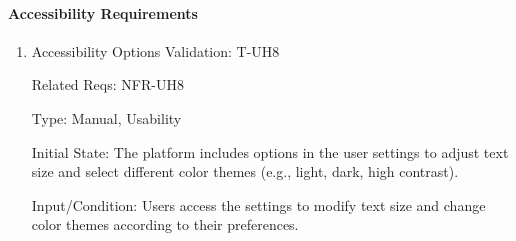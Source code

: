 \documentclass[12pt, titlepage]{article}
\begin{document}
\paragraph{Accessibility Requirements}
\begin{enumerate}

\item{Accessibility Options Validation: T-UH8\\}

Related Reqs: NFR-UH8

Type: Manual, Usability

Initial State: The platform includes options in the user settings to adjust text size and select different color themes (e.g., light, dark, high contrast).

Input/Condition: Users access the settings to modify text size and change color themes according to their preferences.


\end{enumerate}
\end{document}

